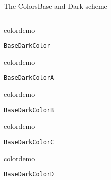 \begin{frame}{The Colors}{Base and Dark scheme}
\begin{columns}
\begin{column}{0.45\textwidth}
\begin{beamercolorbox}[dp=0pt,sep=0em,wd=\bwidth,ht=\bheight]{}
				\begin{beamercolorbox}[sep=0em,wd=\pdim,ht=\pdim]{colordemo}%
				\end{beamercolorbox}\quad\texttt{BaseDarkColor}\newline%
				\begin{beamercolorbox}[sep=0em,wd=\pdim,ht=\pdim]{colordemo}
				\end{beamercolorbox}\quad\texttt{BaseDarkColorA}\hfill\newline%
				\begin{beamercolorbox}[sep=0em,wd=\pdim,ht=\pdim]{colordemo}%
				\end{beamercolorbox}\quad\texttt{BaseDarkColorB}\hfill\newline%
				\begin{beamercolorbox}[sep=0em,wd=\pdim,ht=\pdim]{colordemo}%
				\end{beamercolorbox}\quad\texttt{BaseDarkColorC}\hfill\newline%
				\begin{beamercolorbox}[sep=0em,wd=\pdim,ht=\pdim]{colordemo}%
				\end{beamercolorbox}\quad\texttt{BaseDarkColorD}%
			\end{beamercolorbox}%
		\end{column}
	\end{columns}
\end{frame}
%
%
%
%
%
